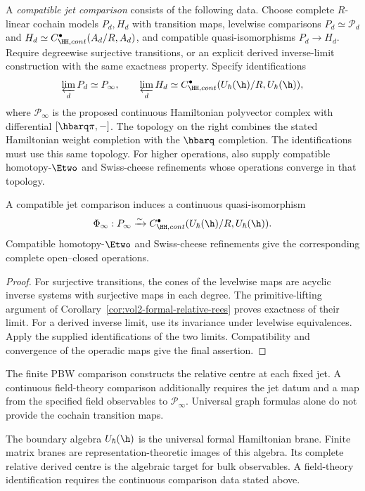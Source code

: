 A \emph{compatible jet comparison} consists of the following data.
Choose complete $R$-linear cochain models $P_d,H_d$ with transition maps,
levelwise comparisons $P_d\simeq\mathcal P_d$ and
$H_d\simeq C^\bullet_{\HH,\mathrm{cont}}(A_d/R,A_d)$,
and compatible quasi-isomorphisms $P_d\to H_d$.
Require degreewise surjective transitions, or an explicit derived
inverse-limit construction with the same exactness property.
Specify identifications
\[
 \varprojlim_dP_d\simeq\mathcal P_\infty,
 \qquad
 \varprojlim_dH_d\simeq
 C^\bullet_{\HH,\mathrm{cont}}
 (\widehat U_\hbar(\h)/R,\widehat U_\hbar(\h)),
\]
where $\mathcal P_\infty$ is the proposed continuous Hamiltonian
polyvector complex with differential $[\hbarq\pi,-]$.
The topology on the right combines the stated Hamiltonian weight
completion with the $\hbarq$ completion.
The identifications must use this same topology.
For higher operations, also supply compatible homotopy-$\Etwo$ and
Swiss-cheese refinements whose operations converge in that topology.

\begin{theorem}\label{thm:vol2-compatible-jets}
A compatible jet comparison induces a continuous quasi-isomorphism
\[
 \Phi_\infty:\mathcal P_\infty
 \xrightarrow{\sim}
 C^\bullet_{\HH,\mathrm{cont}}
 (\widehat U_\hbar(\h)/R,\widehat U_\hbar(\h)).
\]
Compatible homotopy-$\Etwo$ and Swiss-cheese refinements give the
corresponding complete open--closed operations.
\end{theorem}
\begin{proof}
For surjective transitions, the cones of the levelwise maps are
acyclic inverse systems with surjective maps in each degree.
The primitive-lifting argument of
Corollary~\ref{cor:vol2-formal-relative-rees} proves exactness of their limit.
For a derived inverse limit, use its invariance under levelwise equivalences.
Apply the supplied identifications of the two limits.
Compatibility and convergence of the operadic maps give the final assertion.
\end{proof}

The finite PBW comparison constructs the relative centre at each fixed jet.
A continuous field-theory comparison additionally requires the jet datum
and a map from the specified field observables to $\mathcal P_\infty$.
Universal graph formulas alone do not provide the cochain transition maps.

\begin{principle}
The boundary algebra $\widehat U_\hbar(\h)$ is the universal formal Hamiltonian brane.  Finite matrix branes are representation-theoretic images of this algebra.  Its complete relative derived centre is the algebraic target for bulk observables.  A field-theory identification requires the continuous comparison data stated above.
\end{principle}


